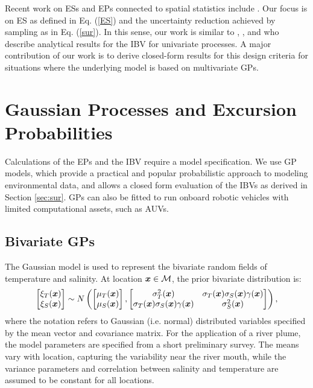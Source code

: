 \documentclass[aoas]{imsart}
\begin{document}
Recent work on ESs and EPs connected to spatial statistics include
\cite{picheny2010,french2013spatio,bolin2015excursion,french2016credible}.
Our focus is on ES as defined in Eq. (\ref{ES}) and the uncertainty
reduction achieved by sampling as in Eq. (\ref{sur}). In this sense,
our work is similar to \cite{bect2012}, \cite{chevalier2014fast}, and
\cite{azzimonti2016quantifying} who describe analytical results for
the IBV for univariate processes. A major contribution of our work is
to derive closed-form results for this design criteria for situations
where the underlying model is based on multivariate GPs.

\section{Gaussian Processes and Excursion Probabilities}
\label{sec:GP_EP}

Calculations of the EPs and the IBV require a model specification. We
use GP models, which provide a practical and popular probabilistic
approach to modeling environmental data, and allows a closed form
evaluation of the IBVs as derived in Section \ref{sec:sur}. GPs can
also be fitted to run onboard robotic vehicles with limited
computational assets, such as AUVs.

\subsection{Bivariate GPs}

The Gaussian model is used to represent the bivariate random fields of
temperature and salinity. At location ${\boldsymbol x} \in \mathcal{M}$, the prior
bivariate distribution is:
\begin{equation}\label{gp_bar}
  \begin{bmatrix}\xi_T(\bx) \\
    \xi_S(\bx) \end{bmatrix}
 \sim N \left( 
\begin{bmatrix} \mu_{T}(\bx)\\
\mu_{S}(\bx)
\end{bmatrix},\begin{bmatrix}
\sigma_{T}^2(\bx) & \sigma_{T}(\bx) \sigma_S(\bx) \gamma(\bx)  \\
\sigma_{T}(\bx) \sigma_S(\bx) \gamma(\bx)  & \sigma_{S}^2(\bx) 
\end{bmatrix}
\right),
\end{equation}
where the notation refers to Gaussian (i.e. normal) distributed
variables specified by the mean vector and covariance matrix. For the
application of a river plume, the model parameters are specified from
a short preliminary survey. The means vary with location, capturing
the variability near the river mouth, while the variance parameters
and correlation between salinity and temperature are assumed to be
constant for all locations. %
\end{document}
